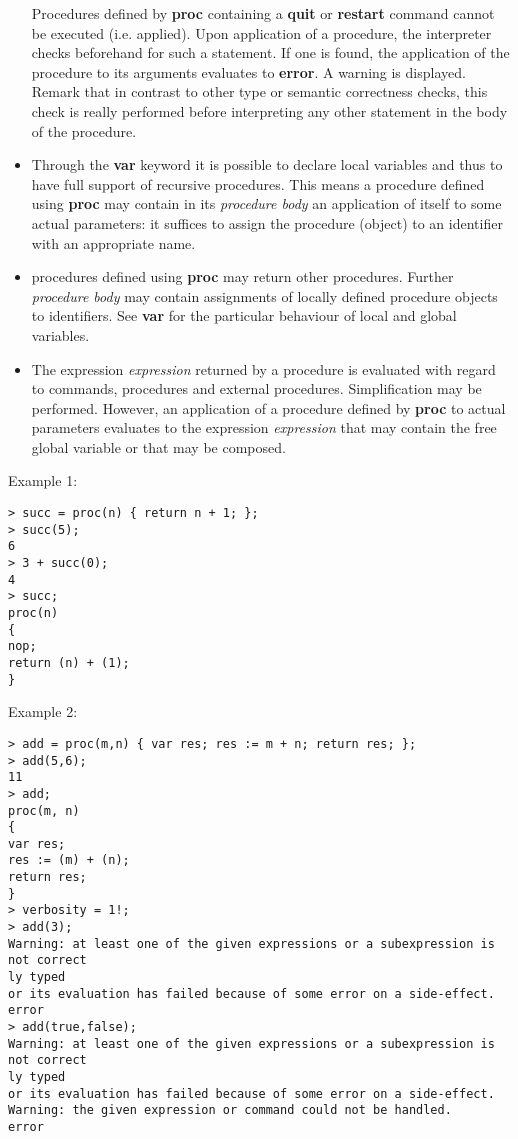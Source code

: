 \begin{itemize}
   Procedures defined by \textbf{proc} containing a \textbf{quit} or \textbf{restart} command
   cannot be executed (i.e. applied). Upon application of a procedure,
   the \sollya interpreter checks beforehand for such a statement. If one
   is found, the application of the procedure to its arguments evaluates
   to \textbf{error}. A warning is displayed. Remark that in contrast to other
   type or semantic correctness checks, this check is really performed
   before interpreting any other statement in the body of the procedure.

\item Through the \textbf{var} keyword it is possible to declare local
   variables and thus to have full support of recursive procedures. This
   means a procedure defined using \textbf{proc} may contain in its \emph{procedure body} 
   an application of itself to some actual parameters: it suffices
   to assign the procedure (object) to an identifier with an appropriate
   name.

\item \sollya procedures defined using \textbf{proc} may return other
   procedures. Further \emph{procedure body} may contain assignments of
   locally defined procedure objects to identifiers. See \textbf{var} for the
   particular behaviour of local and global variables.

\item The expression \emph{expression} returned by a procedure is evaluated with
   regard to \sollya commands, procedures and external
   procedures. Simplification may be performed.  However, an application
   of a procedure defined by \textbf{proc} to actual parameters evaluates to the
   expression \emph{expression} that may contain the free global variable or
   that may be composed.
\end{itemize}
\noindent Example 1: 
\begin{center}\begin{minipage}{15cm}\begin{Verbatim}[frame=single]
> succ = proc(n) { return n + 1; };
> succ(5);
6
> 3 + succ(0);
4
> succ;
proc(n)
{
nop;
return (n) + (1);
}
\end{Verbatim}
\end{minipage}\end{center}
\noindent Example 2: 
\begin{center}\begin{minipage}{15cm}\begin{Verbatim}[frame=single]
> add = proc(m,n) { var res; res := m + n; return res; };
> add(5,6);
11
> add;
proc(m, n)
{
var res;
res := (m) + (n);
return res;
}
> verbosity = 1!;
> add(3);
Warning: at least one of the given expressions or a subexpression is not correct
ly typed
or its evaluation has failed because of some error on a side-effect.
error
> add(true,false);
Warning: at least one of the given expressions or a subexpression is not correct
ly typed
or its evaluation has failed because of some error on a side-effect.
Warning: the given expression or command could not be handled.
error
\end{Verbatim}
\end{minipage}\end{center}
